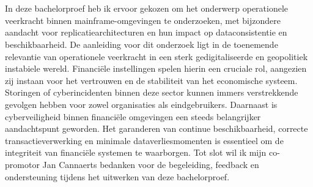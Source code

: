 
\chapter*{}%
\label{ch:voorwoord}


In deze bachelorproef heb ik ervoor gekozen om het onderwerp operationele veerkracht binnen mainframe-omgevingen te onderzoeken, met bijzondere aandacht voor replicatiearchitecturen en hun impact op dataconsistentie en beschikbaarheid.
De aanleiding voor dit onderzoek ligt in de toenemende relevantie van operationele veerkracht in een sterk gedigitaliseerde en geopolitiek instabiele wereld. 
Financiële instellingen spelen hierin een cruciale rol, aangezien zij instaan voor het vertrouwen en de stabiliteit van het economische systeem. 
Storingen of cyberincidenten binnen deze sector kunnen immers verstrekkende gevolgen hebben voor zowel organisaties als eindgebruikers.
Daarnaast is cyberveiligheid binnen financiële omgevingen een steeds belangrijker aandachtspunt geworden. 
Het garanderen van continue beschikbaarheid, correcte transactieverwerking en minimale dataverliesmomenten is essentieel om de integriteit van financiële systemen te waarborgen.
Tot slot wil ik mijn co-promotor Jan Cannaerts bedanken voor de begeleiding, feedback en ondersteuning tijdens het uitwerken van deze bachelorproef.